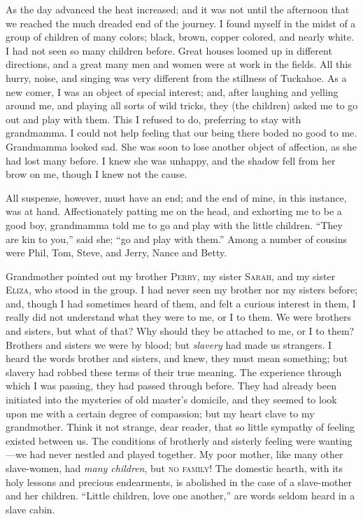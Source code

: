 As the day advanced the heat increased; and it was not until the
afternoon that we reached the much dreaded end of the journey. I found
myself in the midst of a group of children of many colors; black, brown,
copper colored, and nearly white. I had not seen so many children
before. Great houses loomed up in different directions, and a great many
men and women were at work in the fields. All this hurry, noise, and
singing was very different from the stillness of Tuckahoe. As a new
comer, I was an object of special interest; and, after laughing and
yelling around me, and playing all sorts of wild tricks, they (the
children) asked me to go out and play with them. This I refused to do,
preferring to stay with grandmamma. I could not help feeling that our
being there boded no good to me. Grandmamma looked sad. She was soon to
lose another object of affection, as she had lost many before. I knew
she was unhappy, and the shadow fell from her brow on me, though I knew
not the cause.

All suspense, however, must have an end; and the end of mine, in this
instance, was at hand. Affectionately patting me on the head, and
exhorting me to be a good boy, grandmamma told me to go and play with
the little children. ``They are kin to you,'' {}said she; ``go and play
with them.'' Among a number of cousins were Phil, Tom, Steve, and Jerry,
Nance and Betty.

Grandmother pointed out my brother \textsc{Perry}, my sister
\textsc{Sarah}, and my sister \textsc{Eliza}, who stood in the group. I
had never seen my brother nor my sisters before; and, though I had
sometimes heard of them, and felt a curious interest in them, I really
did not understand what they were to me, or I to them. We were brothers
and sisters, but what of that? Why should they be attached to me, or I
to them? Brothers and sisters we were by blood; but \emph{slavery} had
made us strangers. I heard the words brother and sisters, and knew, they
must mean something; but slavery had robbed these terms of their true
meaning. The experience through which I was passing, they had passed
through before. They had already been initiated into the mysteries of
old master's domicile, and they seemed to look upon me with a certain
degree of compassion; but my heart clave to my grandmother. Think it not
strange, dear reader, that so little sympathy of feeling existed between
us. The conditions of brotherly and sisterly feeling were wanting---we
had never nestled and played together. My poor mother, like many other
slave-women, had \emph{many children}, but \textsc{no family}! The
domestic hearth, with its holy lessons and precious endearments, is
abolished in the case of a slave-mother and her children. ``Little
children, love one another,'' are words seldom heard in a slave cabin.

